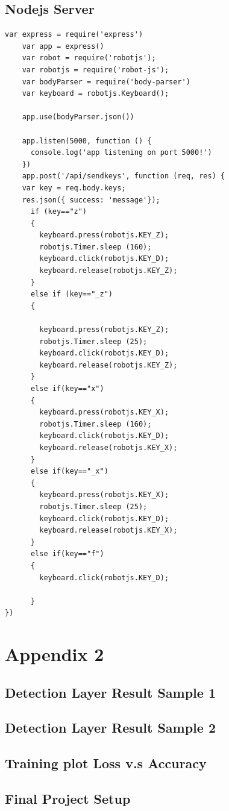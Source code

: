 \documentclass[onecolumn, draftclsnofoot,10pt, compsoc]{IEEEtran}
\begin{document}
\subsection{Nodejs Server}
\begin{lstlisting}[language=VBScript,caption=Nodejs script runs a server and listen for client request to execute keyboard commands.]
	var express = require('express')
	var app = express()
	var robot = require('robotjs');
	var robotjs = require('robot-js');
	var bodyParser = require('body-parser')
	var keyboard = robotjs.Keyboard();

	app.use(bodyParser.json())

	app.listen(5000, function () {
	  console.log('app listening on port 5000!')
	})
	app.post('/api/sendkeys', function (req, res) {
	var key = req.body.keys;
	res.json({ success: 'message'});
	  if (key=="z")
	  {
	    keyboard.press(robotjs.KEY_Z);
	    robotjs.Timer.sleep (160);
	    keyboard.click(robotjs.KEY_D);
	    keyboard.release(robotjs.KEY_Z);
	  }
	  else if (key=="_z")
	  {

	    keyboard.press(robotjs.KEY_Z);
	    robotjs.Timer.sleep (25);
	    keyboard.click(robotjs.KEY_D);
	    keyboard.release(robotjs.KEY_Z);
	  }
	  else if(key=="x")
	  {
	    keyboard.press(robotjs.KEY_X);
	    robotjs.Timer.sleep (160);
	    keyboard.click(robotjs.KEY_D);
	    keyboard.release(robotjs.KEY_X);
	  }
	  else if(key=="_x")
	  {
	    keyboard.press(robotjs.KEY_X);
	    robotjs.Timer.sleep (25);
	    keyboard.click(robotjs.KEY_D);
	    keyboard.release(robotjs.KEY_X);
	  }
	  else if(key=="f")
	  {
	    keyboard.click(robotjs.KEY_D);

	  }
})
\end{lstlisting}
\section{Appendix 2}
\subsection{Detection Layer Result Sample 1}
\begin{center}
\end{center}
\subsection{Detection Layer Result Sample 2}
\begin{center}
\end{center}
\subsection{Training plot Loss v.s Accuracy}
\begin{center}
\end{center}
\subsection{Final Project Setup}
\begin{center}
\end{center}
\end{document}

